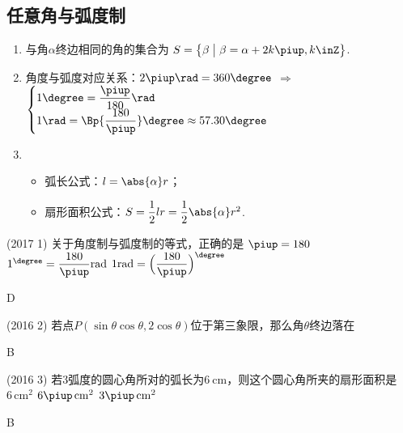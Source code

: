   \subsection{任意角与弧度制}
    \begin{enumerate}[label=\arabic*)]
      \item 与角$ \alpha $终边相同的角的集合为
        $ S=\bigl\{\beta \bigm| \beta =\alpha+2k\piup,k\inZ\bigr\} $.
      \item 角度与弧度对应关系：$2\piup\rad=360\degree$
        $\Rightarrow$
        $\begin{cases}
          1\degree=\dfrac{\piup}{180}\rad\\
          1\rad=\Bp{\dfrac{180}{\piup}}\degree\approx57.30\degree
        \end{cases}$
      \item
        \begin{itemize}
          \item 弧长公式：$l=\abs{\alpha}r$；
          \item 扇形面积公式：$S=\dfrac12 lr=\dfrac12 \abs{\alpha}r^2$.
        \end{itemize}
    \end{enumerate}
    \begin{exercise}
      \item%
        (2017  1)
        关于角度制与弧度制的等式，正确的是\xz
          {$\piup=180$}
          {$1^{\degree}=\dfrac{180}{\piup}\rm{rad}$}
          {$1\rm{rad}=\Bigl(\dfrac{180}{\piup}\Bigr)^\degree$}
        \begin{answer}
          D
        \end{answer}
      \item%
        (2016  2)
        若点$P(\sin\theta\cos\theta,2\cos\theta)$位于第三象限，那么角$\theta$终边落在\xz
        \begin{answer}
          B
        \end{answer}
      \item%
        (2016  3)
        若3弧度的圆心角所对的弧长为$\SI{6}{\cm}$，则这个圆心角所夹的扇形面积是\xz
         {$6\,\mathrm{cm}^{\mathrm2}$}
         {$6\piup\,\mathrm{cm}^{\mathrm2}$}
         {$3\piup\,\mathrm{cm}^{\mathrm2}$}
        \begin{answer}
          B
        \end{answer}
    \end{exercise}
  \vspace{1.5cm}
